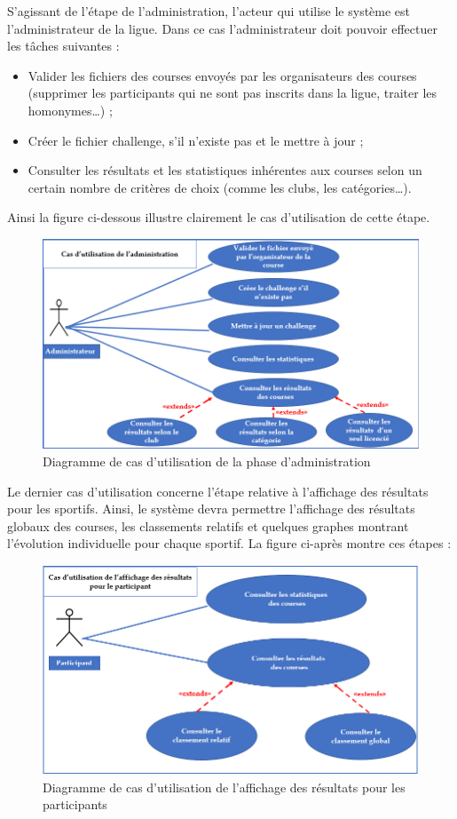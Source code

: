 S’agissant de l’étape de l’administration, l’acteur qui utilise le système est l’administrateur de la ligue. Dans ce cas l’administrateur doit pouvoir effectuer les tâches suivantes :
\begin{itemize} 
\item Valider les fichiers des courses envoyés par les organisateurs des courses (supprimer les participants qui ne sont pas inscrits dans la ligue, traiter les homonymes…) ;
\item Créer le fichier challenge, s’il n’existe pas et le mettre à jour ;
\item  Consulter les résultats et les statistiques inhérentes aux courses selon un certain nombre de critères de choix (comme les clubs, les catégories…).
\end{itemize} 

\newpage
Ainsi la figure ci-dessous illustre clairement le cas d’utilisation de cette étape.

\begin{figure}[!h]
	   \center
	   \includegraphics[scale=0.8]{img/Diagramme_cas_utilisation_administration_challenge.png}
	   \caption {Diagramme de cas d’utilisation de la phase d’administration}
\end{figure}
Le dernier cas d’utilisation concerne l’étape relative à l’affichage des résultats pour les sportifs.  Ainsi, le système devra permettre l’affichage des résultats globaux des courses, les classements relatifs et quelques graphes montrant l’évolution individuelle pour chaque sportif.
La figure ci-après montre ces étapes :
\begin{figure}[!h]
	   \center
	   \includegraphics[scale=0.8]{img/Diagramme_cas_utilisation_consultation_resultats.png}
	   \caption {Diagramme de cas d’utilisation de l’affichage des résultats pour les participants}
\end{figure}
